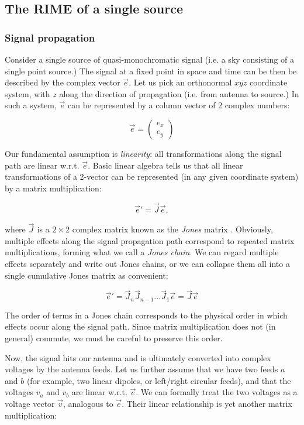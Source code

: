 \documentclass[]{aa}
\newcommand{\jones}[2]{\vec {#1}_{#2}}
\begin{document}
\subsection{The RIME of a single source}

\subsubsection{Signal propagation}

Consider a single source of quasi-monochromatic signal (i.e. a sky consisting of a single point source.) The signal at a fixed point in space and time can be then be described by the complex vector $\vec e$. Let us pick an orthonormal $xyz$ coordinate system, with $z$ along the direction of propagation (i.e. from antenna to source.) In such a system, $\vec e$ can be represented by a column vector of 2 complex numbers:

\[
\vec e = \left( \begin{array}{c}e_x\\e_y\end{array} \right) 
\]

Our fundamental assumption is {\em linearity}: all transformations along the signal path are linear w.r.t. $\vec e$. Basic linear algebra tells us that all linear transformations of a 2-vector can be represented (in any given coordinate system) by a matrix multiplication:

\[
\vec e' = \jones{J}{} \vec e,
\]

where $\jones{J}{}$ is a $2\times2$ complex matrix known as the {\em Jones} matrix \citep{jones}. Obviously, multiple effects along the signal propagation path correspond to repeated matrix multiplications, forming what we call a {\em Jones chain}. We can regard multiple effects separately and write out Jones chains, or we can collapse them all into a single cumulative Jones matrix as convenient:

\begin{equation}\label{eq:jones-chain}
\vec e' = \jones{J}{n} \jones{J}{n-1} ... \jones{J}{1} \vec e = \jones{J}{} \vec e
\end{equation}

The order of terms in a Jones chain corresponds to the physical order in which effects occur along the signal path. Since matrix multiplication does not (in general) commute, we must be careful to preserve this order. 

Now, the signal hits our antenna and is ultimately converted into complex voltages by the antenna feeds. Let us further assume that we have two feeds $a$ and $b$ (for example, two linear dipoles, or left/right circular feeds), and that the voltages $v_a$ and $v_b$ are linear w.r.t. $\vec e$. We can formally treat the two voltages as a voltage vector $\vec v$, analogous to $\vec e$. Their linear relationship is yet another matrix multiplication:
\end{document}
